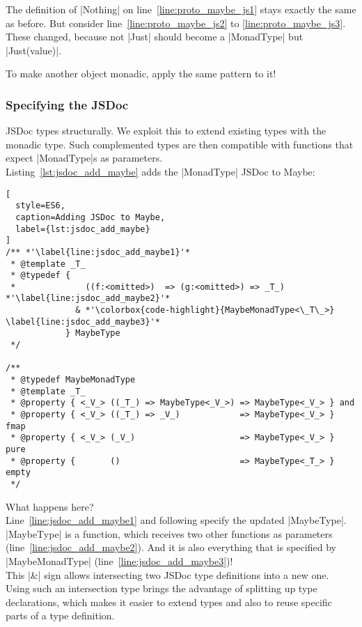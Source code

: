 The definition of |Nothing| on line~\ref{line:proto_maybe_js1} stays exactly
the same as before. But consider line~\ref{line:proto_maybe_js2} to
\ref{line:proto_maybe_js3}. These changed, because not |Just| should become a
|MonadType| but |Just(value)|.

To make another object monadic, apply the same pattern to it!

\subsubsection{Specifying the JSDoc} %
\label{subsub:Specify the JSDoc}
JSDoc types structurally. We exploit this to extend existing types with
the monadic type. Such complemented types are then compatible with functions
that expect |MonadType|s as parameters. \\ 
Listing~\ref{lst:jsdoc_add_maybe} adds the |MonadType| JSDoc to Maybe:

\begin{lstlisting}[
  style=ES6,
  caption=Adding JSDoc to Maybe,
  label={lst:jsdoc_add_maybe}
]
/** *'\label{line:jsdoc_add_maybe1}'*
 * @template _T_
 * @typedef { 
 *              ((f:<omitted>)  => (g:<omitted>) => _T_) *'\label{line:jsdoc_add_maybe2}'*
              & *'\colorbox{code-highlight}{MaybeMonadType<\_T\_>} \label{line:jsdoc_add_maybe3}'*
            } MaybeType
 */

/** 
 * @typedef MaybeMonadType
 * @template _T_
 * @property { <_V_> ((_T_) => MaybeType<_V_>) => MaybeType<_V_> } and
 * @property { <_V_> ((_T_) => _V_)            => MaybeType<_V_> } fmap
 * @property { <_V_> (_V_)                     => MaybeType<_V_> } pure
 * @property {       ()                        => MaybeType<_T_> } empty
 */
\end{lstlisting}

What happens here? \\ 
Line~\ref{line:jsdoc_add_maybe1} and following specify the updated |MaybeType|.
|MaybeType| is a function, which receives two other functions as parameters
(line~\ref{line:jsdoc_add_maybe2}). And it is also everything that is specified by
|MaybeMonadType| (line~\ref{line:jsdoc_add_maybe3})! \\
This |&| sign allows intersecting two JSDoc type definitions into a new one.\\

Using such an intersection type brings the advantage of splitting up type
declarations, which makes it easier to extend types and also to reuse specific
parts of a type definition.

